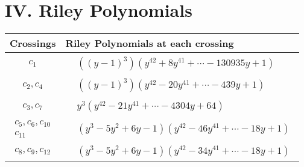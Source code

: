 \documentclass[1p]{elsarticle_modified}
\theoremstyle{definition}
\begin{document}
\centering \section*{ IV. Riley Polynomials}
\begin{tabular}{m{50pt}|m{274pt}}
Crossings & \hspace{64pt}Riley Polynomials at each crossing \\
\hline $$\begin{aligned}c_{1}\end{aligned}$$&$\begin{aligned}
&((y-1)^3)(y^{42}+8 y^{41}+\cdots-130935 y+1)
\end{aligned}$\\
\hline $$\begin{aligned}c_{2},c_{4}\end{aligned}$$&$\begin{aligned}
&((y-1)^3)(y^{42}-20 y^{41}+\cdots-439 y+1)
\end{aligned}$\\
\hline $$\begin{aligned}c_{3},c_{7}\end{aligned}$$&$\begin{aligned}
&y^3(y^{42}-21 y^{41}+\cdots-4304 y+64)
\end{aligned}$\\
\hline $$\begin{aligned}c_{5},c_{6},c_{10}\\c_{11}\end{aligned}$$&$\begin{aligned}
&(y^3-5 y^2+6 y-1)(y^{42}-46 y^{41}+\cdots-18 y+1)
\end{aligned}$\\
\hline $$\begin{aligned}c_{8},c_{9},c_{12}\end{aligned}$$&$\begin{aligned}
&(y^3-5 y^2+6 y-1)(y^{42}-34 y^{41}+\cdots-18 y+1)
\end{aligned}$\\
\hline
\end{tabular}
\vskip 2pc
\end{document}
